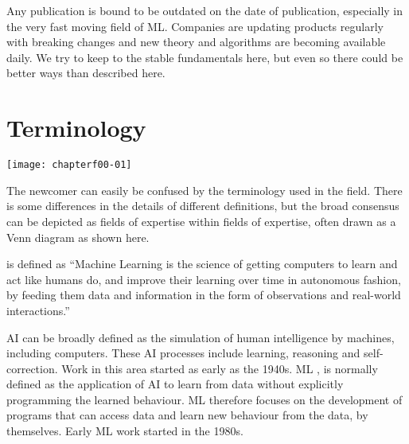 Any publication is bound to be outdated on the date of publication, especially in the very fast moving field of \ac{ML}. Companies are updating products regularly with breaking changes and new theory and algorithms are becoming available daily. We try to keep to the stable fundamentals here, but even so there could be better ways than described here.

\section*{Terminology}

\begin{marginfigure}
\texttt{[image: chapterf00-01]}
\end{marginfigure}

The newcomer can easily be confused by the terminology used in the field.  There is some differences in the details of different definitions, but the broad consensus can be depicted as fields of expertise within fields of expertise, often drawn as a Venn diagram as shown here.

 is defined as \cite{DanielFaggella2019} ``Machine Learning is the science of getting computers to learn and act like humans do, and improve their learning over time in autonomous fashion, by feeding them data and information in the form of observations and real-world interactions.''

\ac{AI} can be broadly defined as the simulation of human intelligence by machines, including computers. These \ac{AI} processes include learning, reasoning and self-correction. Work in this area started as early as the 1940s. \ac{ML} \cite{WikiPediaMachineLearning2019,DanielFaggella2019}, is normally defined as the application of \ac{AI} to learn from data without explicitly programming the learned behaviour. \ac{ML} therefore focuses on the development of programs that can access data and learn new behaviour from the data, by themselves.  Early ML work started in the 1980s. 

